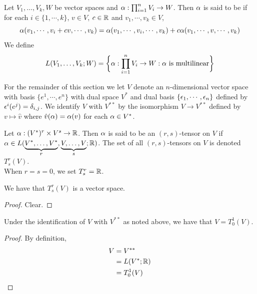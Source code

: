 \documentclass{book}
\begin{document}
	\begin{defn}
	Let $V_1, \dots, V_k, W$ be vector spaces and $\alpha : \prod_{i=1}^n V_i \rightarrow W$. Then $\alpha$ is said to be  if for each $i \in \{1, \cdots, k\}$, $v \in V$, $c \in \mathbb{R}$ and $v_1, \cdots, v_k \in V$, $$\alpha(v_1, \cdots, v_i + cv, \cdots, v_k) = \alpha(v_1, \cdots, v_i, \cdots, v_k) + c\alpha(v_1, \cdots, v, \cdots, v_k)$$
	We define $$L(V_1, \dots, V_k; W) = \bigg \{\alpha : \prod_{i=1}^n V_i \rightarrow W: \alpha \text{ is multilinear} \bigg\}$$ 
	\end{defn}	
	
	\begin{note}
		For the remainder of this section we let $V$ denote an $n$-dimensional vector space with basis $\{e^1, \cdots, e^n\}$ with dual space $V^*$ and dual basis $\{\epsilon_1, \cdots, \epsilon_n\}$ defined by $\epsilon^i(e^j) = \delta_{i,j}$. We identify $V$ with $V^{**}$ by the isomorphism $V \rightarrow V^{**}$ defined by $v \mapsto \hat{v}$ where $\hat{v}(\alpha) = \alpha(v)$ for each $\alpha \in V^*$. 
	\end{note}	
	
	\begin{defn}
	Let $\alpha: (V^*)^r \times V^s \rightarrow \mathbb{R}$. Then $\alpha$ is said to be an $(r,s)$-tensor on $V$ if $\alpha \in L(\underbrace{V^*, \dots, V^*}_{r}, \underbrace{V, \dots, V}_{s}; \mathbb{R})$. The set of all $(r,s)$-tensors on $V$ is denoted $T^r_s(V)$. \\
	When $r=s=0$, we set $T^r_s = \mathbb{R}$.
	\end{defn}
	
	\begin{ex}
		We have that $T^r_s(V)$ is a vector space. 
	\end{ex}

	\begin{proof}
		Clear.
	\end{proof}
	
	\begin{ex}
	Under the identification of $V$ with $V^{**}$ as noted above, we have that $V = T^1_0(V)$. 
	\end{ex}
	
	\begin{proof}
	By definition,
	\begin{align*}
	V 
	& = V^{**} \\
	& = L(V^*; \mathbb{R}) \\
	& = T^1_0(V)
	\end{align*}
	\end{proof}
	
\end{document}
